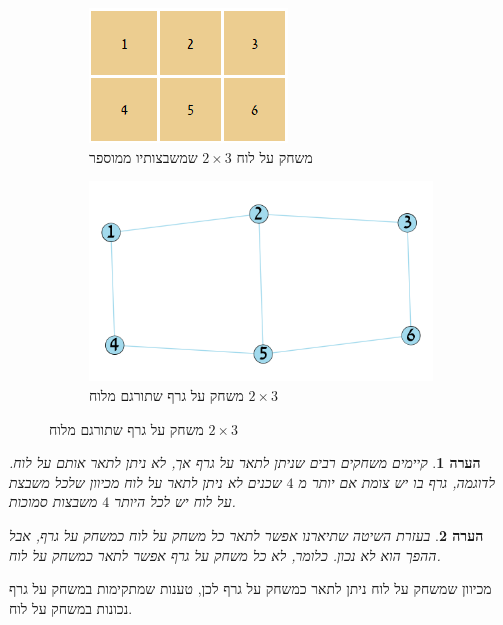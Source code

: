 \documentclass[12pt,leqno]{article}
\theoremstyle{theoremdd}
\newtheorem{comm}{הערה}[section]
\begin{document}
\begin{figure}[ht]
    \caption{
        דוגמה
        למשחק על לוח שתורגם למשחק על גרף
        }
    \begin{subfigure}{.5\textwidth}
        \caption{
            משחק על לוח
            $2 \times 3$
            שמשבצותיו
            ממוספר
        }
        \label{2x3_board}
        \centering
        \includegraphics[scale=.95]{images/2x3_board.PNG}
    \end{subfigure}%
    \begin{subfigure}{.5\textwidth}
        \caption{
            משחק על גרף
            שתורגם מלוח
            $2 \times 3$
        }
        \centering
        \label{2x3_graph}
        \includegraphics[scale=0.8]{images/2x3_graph.png}
    \end{subfigure}%
\end{figure}

\begin{comm}
קיימים משחקים רבים שניתן לתאר על גרף אך, לא ניתן לתאר אותם על לוח.
לדוגמה, גרף בו יש צומת אם יותר מ
$4$
שכנים
לא ניתן לתאר על לוח מכיוון
שלכל
משבצת על לוח
יש לכל היותר
$4$
משבצות סמוכות.
\end{comm}
\begin{comm}
    בעזרת השיטה שתיארנו אפשר לתאר כל משחק על לוח כמשחק על גרף, אבל ההפך הוא לא נכון.
כלומר, לא כל משחק על גרף אפשר לתאר כמשחק על לוח.
\end{comm}
מכיוון שמשחק על לוח ניתן לתאר כמשחק על גרף לכן, טענות שמתקימות
במשחק על גרף נכונות במשחק על לוח.
\end{document}
